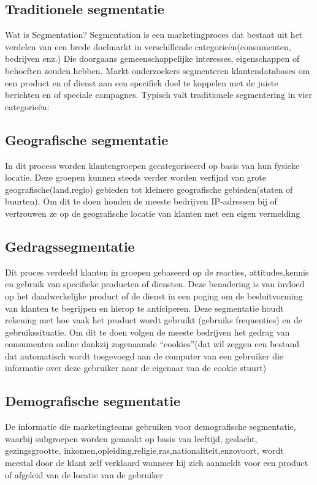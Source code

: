 \subsection{Traditionele segmentatie}
Wat is Segmentation? Segmentation is een marketingproces dat bestaat uit het verdelen van een brede doelmarkt in verschillende categorieën(consumenten, bedrijven enz.) Die doorgaans gemeenschappelijke interesses, eigenschappen of behoeften zouden hebben. Markt onderzoekers segmenteren klantendatabases om een product en of dienst aan een specifiek doel te koppelen met de juiste berichten en of speciale campagnes. Typisch valt traditionele segmentering in vier categorieën: 

\subsection{Geografische segmentatie}
In dit process worden klantengroepen gecategoriseerd op basis van hun fysieke locatie. Deze groepen kunnen steeds verder worden verfijnd van grote geografische(land,regio) gebieden tot kleinere geografische gebieden(staten of buurten). Om dit te doen houden de meeste bedrijven IP-adressen bij of vertrouwen ze op de geografische locatie van klanten met een eigen vermelding

\subsection{Gedragssegmentatie}
Dit proces verdeeld klanten in groepen gebaseerd op de reacties, attitudes,kennis en gebruik van specifieke producten of diensten. Deze benadering is van invloed op het daadwerkelijke product of de dienst in een poging om de besluitvorming van klanten te begrijpen en hierop te anticiperen. Deze segmentatie houdt rekening met hoe vaak het product wordt gebruikt (gebruiks frequenties) en  de gebruikssituatie. Om dit te doen volgen de meeste bedrijven het gedrag van consumenten online dankzij zogenaamde “cookies”(dat wil zeggen een bestand dat automatisch wordt toegevoegd aan de computer van een gebruiker die informatie over deze gebruiker naar de eigenaar van de cookie stuurt)

\subsection{Demografische segmentatie}
De informatie die marketingteams gebruiken voor demografische segmentatie, waarbij subgroepen worden gemaakt op basis van leeftijd, geslacht, gezingsgrootte, inkomen,opleiding,religie,ras,nationaliteit,enzovoort, wordt meestal door de klant zelf verklaard wanneer hij zich aanmeldt voor een product of afgeleid van de locatie van de gebruiker

